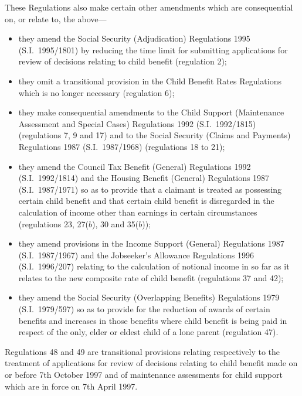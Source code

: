 \documentclass[12pt,a4paper]{article}
\begin{document}
  These Regulations also make certain other amendments which are consequential on, or relate to, the above—
\begin{itemize}
\item they amend the Social Security (Adjudication) Regulations 1995 (S.I.\ 1995/1801) by reducing the time limit for submitting applications for review of decisions relating to child benefit (regulation 2);

\item they omit a transitional provision in the Child Benefit Rates Regulations which is no longer necessary (regulation 6);

\item they make consequential amendments to the Child Support (Maintenance Assessment and Special Cases) Regulations 1992 (S.I.\ 1992/\hspace{0pt}1815) (regulations 7, 9 and 17) and to the Social Security (Claims and Payments) Regulations 1987 (S.I.\ 1987/1968) (regulations 18 to 21);

\item they amend the Council Tax Benefit (General) Regulations 1992 (S.I.\ 1992/1814) and the Housing Benefit (General) Regulations 1987 (S.I.\ 1987/1971) so as to provide that a claimant is treated as possessing certain child benefit and that certain child benefit is disregarded in the calculation of income other than earnings in certain circumstances (regulations 23, 27($b$), 30 and 35($b$));

\item they amend provisions in the Income Support (General) Regulations 1987 (S.I.\ 1987/1967) and the Jobseeker’s Allowance Regulations 1996 (S.I.\ 1996/207) relating to the calculation of notional income in so far as it relates to the new composite rate of child benefit (regulations 37 and 42);

\item they amend the Social Security (Overlapping Benefits) Regulations 1979 (S.I.\ 1979/597) so as to provide for the reduction of awards of certain benefits and increases in those benefits where child benefit is being paid in respect of the only, elder or eldest child of a lone parent (regulation 47).
\end{itemize}

  Regulations 48 and 49 are transitional provisions relating respectively to the treatment of applications for review of decisions relating to child benefit made on or before 7th October 1997 and of maintenance assessments for child support which are in force on 7th April 1997.
\end{document}
